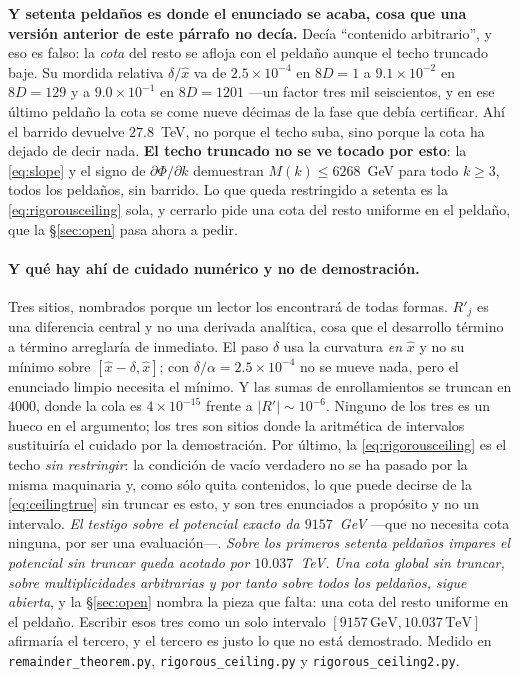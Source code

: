 \documentclass[11pt,a4paper]{article}
\begin{document}
\noindent\textbf{Y setenta peldaños es donde el enunciado se acaba, cosa que una versión anterior
de este párrafo no decía.} Decía ``contenido arbitrario'', y eso es falso: la \emph{cota} del resto
se afloja con el peldaño aunque el techo truncado baje. Su mordida relativa $\delta/\hat x$ va de
$2.5\times10^{-4}$ en $8D=1$ a $9.1\times10^{-2}$ en $8D=129$ y a $9.0\times10^{-1}$ en $8D=1201$
---un factor tres mil seiscientos, y en ese último peldaño la cota se come nueve décimas de la fase
que debía certificar. Ahí el barrido devuelve $27.8$~TeV, no porque el techo suba, sino porque la
cota ha dejado de decir nada. \textbf{El techo truncado no se ve tocado por esto}: la
\eqref{eq:slope} y el signo de $\partial\Phi/\partial k$ demuestran $M(k)\le6268$~GeV para todo
$k\ge3$, todos los peldaños, sin barrido. Lo que queda restringido a setenta es la
\eqref{eq:rigorousceiling} sola, y cerrarlo pide una cota del resto uniforme en el peldaño, que la
\S\ref{sec:open} pasa ahora a pedir.

\paragraph{Y qué hay ahí de cuidado numérico y no de demostración.} Tres sitios, nombrados porque un
lector los encontrará de todas formas. $R'_j$ es una diferencia central y no una derivada analítica,
cosa que el desarrollo término a término arreglaría de inmediato. El paso $\delta$ usa la curvatura
\emph{en} $\hat x$ y no su mínimo sobre $[\hat x-\delta,\hat x]$; con $\delta/\alpha=2.5\times10^{-4}$
no se mueve nada, pero el enunciado limpio necesita el mínimo. Y las sumas de enrollamientos se
truncan en $4000$, donde la cola es $4\times10^{-15}$ frente a $|R'|\sim10^{-6}$. Ninguno de los tres
es un hueco en el argumento; los tres son sitios donde la aritmética de intervalos sustituiría el
cuidado por la demostración. Por último, la \eqref{eq:rigorousceiling} es el techo \emph{sin
restringir}: la condición de vacío verdadero no se ha pasado por la misma maquinaria y, como sólo
quita contenidos, lo que puede decirse de la \eqref{eq:ceilingtrue} sin truncar es esto, y son tres
enunciados a propósito y no un intervalo. \emph{El testigo sobre el potencial exacto da $9157$~GeV}
---que no necesita cota ninguna, por ser una evaluación---. \emph{Sobre los primeros setenta
peldaños impares el potencial sin truncar queda acotado por $10.037$~TeV.} \emph{Una cota global sin
truncar, sobre multiplicidades arbitrarias y por tanto sobre todos los peldaños, sigue abierta}, y
la \S\ref{sec:open} nombra la pieza que falta: una cota del resto uniforme en el peldaño. Escribir
esos tres como un solo intervalo $[9157\,\text{GeV},10.037\,\text{TeV}]$ afirmaría el tercero, y el
tercero es justo lo que no está demostrado. Medido en
\texttt{remainder\_\allowbreak theorem.py}, \texttt{rigorous\_\allowbreak ceiling.py} y
\texttt{rigorous\_\allowbreak ceiling2.py}.
\end{document}
